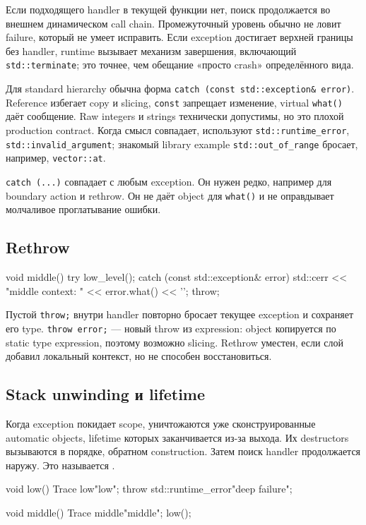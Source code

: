Если подходящего handler в текущей функции нет, поиск продолжается во внешнем
динамическом call chain. Промежуточный уровень обычно не ловит failure, который
не умеет исправить. Если exception достигает верхней границы без handler,
runtime вызывает механизм завершения, включающий \texttt{std::terminate}; это
точнее, чем обещание «просто crash» определённого вида.

Для standard hierarchy обычна форма
\texttt{catch (const std::exception\& error)}. Reference избегает copy и slicing,
\texttt{const} запрещает изменение, virtual \texttt{what()} даёт сообщение.
Raw integers и strings технически допустимы, но это плохой production contract.
Когда смысл совпадает, используют \texttt{std::runtime\_error},
\texttt{std::invalid\_argument}; знакомый library example
\texttt{std::out\_of\_range} бросает, например, \texttt{vector::at}.

\texttt{catch (...)} совпадает с любым exception. Он нужен редко, например для
boundary action и rethrow. Он не даёт object для \texttt{what()} и не оправдывает
молчаливое проглатывание ошибки.

\subsection{Rethrow}

\begin{cppcode}
void middle() {
    try {
        low_level();
    } catch (const std::exception& error) {
        std::cerr << "middle context: " << error.what() << '\n';
        throw;
    }
}
\end{cppcode}

Пустой \texttt{throw;} внутри handler повторно бросает текущее exception и
сохраняет его type. \texttt{throw error;} --- новый throw из expression:
object копируется по static type expression, поэтому возможно slicing. Rethrow
уместен, если слой добавил локальный контекст, но не способен восстановиться.

\subsection{Stack unwinding и lifetime}

Когда exception покидает scope, уничтожаются уже сконструированные automatic
objects, lifetime которых заканчивается из-за выхода. Их destructors вызываются
в порядке, обратном construction. Затем поиск handler продолжается наружу. Это
называется .

\begin{cppcode}
void low() {
    Trace low{"low"};
    throw std::runtime_error{"deep failure"};
}

void middle() {
    Trace middle{"middle"};
    low();
}
\end{cppcode}

